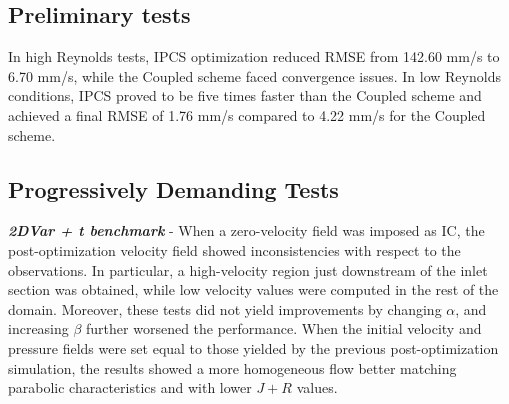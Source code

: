 \subsection*{Preliminary tests}
In high Reynolds tests, IPCS optimization reduced RMSE from 142.60 mm/s to 6.70 mm/s, while the Coupled scheme faced convergence issues. In low Reynolds conditions, IPCS proved to be five times faster than the Coupled scheme and achieved a final RMSE of 1.76 mm/s compared to 4.22 mm/s for the Coupled scheme.

\subsection*{Progressively Demanding Tests}
\textbf{\textit{2DVar + t benchmark}} - When a zero-velocity field was imposed as IC, the post-optimization velocity field showed inconsistencies with respect to the observations.
In particular, a high-velocity region just downstream of the inlet section was obtained, while low velocity values were computed in the rest of the domain.
Moreover, these tests did not yield improvements by changing \(\alpha\), and increasing \(\beta\) further worsened the performance. When the initial velocity and pressure fields were set equal to those yielded by the previous post-optimization simulation, the results showed a more homogeneous flow better matching parabolic characteristics and with lower \(J + R\) values.\\

